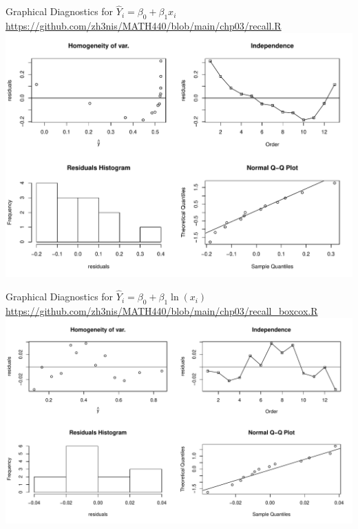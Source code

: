 \documentclass{beamer}
\begin{document}
\begin{frame}{Graphical Diagnostics for $\hat{Y}_i=\beta_0+\beta_1 x_i$}{\url{https://github.com/zh3nis/MATH440/blob/main/chp03/recall.R}}
\includegraphics[width=\textwidth]{plots/baseline_diag.pdf}
\end{frame}

\begin{frame}{Graphical Diagnostics for $\hat{Y}_i=\beta_0+\beta_1\ln(x_i)$}{\url{https://github.com/zh3nis/MATH440/blob/main/chp03/recall_boxcox.R}}
\includegraphics[width=\textwidth]{plots/recall_bc_diag.pdf}
\end{frame}
\end{document}
